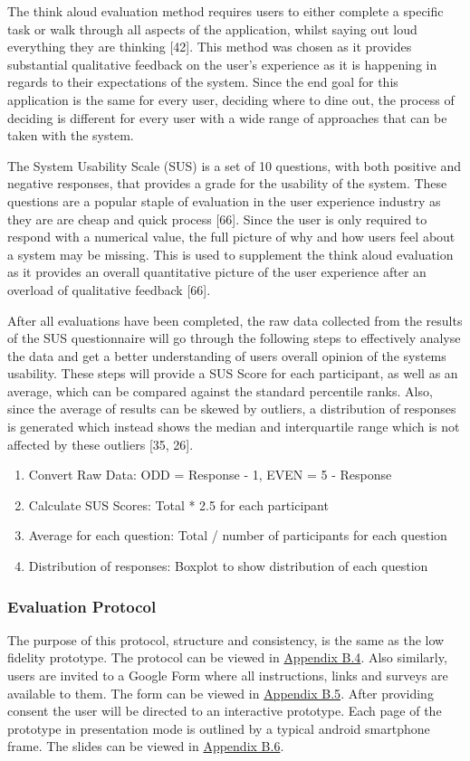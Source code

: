 \documentclass[a4 paper, 12pt]{article}
\begin{document}
    The think aloud evaluation method requires users to either complete a specific task or walk through all aspects of the application, whilst saying out loud everything they are thinking [42]. This method was chosen as it provides substantial qualitative feedback on the user's experience as it is happening in regards to their expectations of the system. Since the end goal for this application is the same for every user, deciding where to dine out, the process of deciding is different for every user with a wide range of approaches that can be taken with the system.

    The System Usability Scale (SUS) is a set of 10 questions, with both positive and negative responses, that provides a grade for the usability of the system. These questions are a popular staple of evaluation in the user experience industry as they are are cheap and quick process [66]. Since the user is only required to respond with a numerical value, the full picture of why and how users feel about a system may be missing. This is used to supplement the think aloud evaluation as it provides an overall quantitative picture of the user experience after an overload of qualitative feedback [66].
    
    After all evaluations have been completed, the raw data collected from the results of the SUS questionnaire will go through the following steps to effectively analyse the data and get a better understanding of users overall opinion of the systems usability. These steps will provide a SUS Score for each participant, as well as an average, which can be compared against the standard percentile ranks. Also, since the average of results can be skewed by outliers, a distribution of responses is generated which instead shows the median and interquartile range which is not affected by these outliers [35, 26].
        \begin{enumerate}
            \item Convert Raw Data: ODD = Response - 1, EVEN = 5 - Response
            \item Calculate SUS Scores: Total * 2.5 for each participant
            \item  Average for each question: Total / number of participants for each question
            \item Distribution of responses: Boxplot to show distribution of each question
        \end{enumerate}  

    \subsubsection{Evaluation Protocol}
    The purpose of this protocol, structure and consistency, is the same as the low fidelity prototype. The protocol can be viewed in \hyperref[sec:B.4]{Appendix B.4}. Also similarly, users are invited to a Google Form where all instructions, links and surveys are available to them. The form can be viewed in \hyperref[sec:B.5]{Appendix B.5}. After providing consent the user will be directed to an interactive prototype. Each page of the prototype in presentation mode is outlined by a typical android smartphone frame. The slides can be viewed in \hyperref[sec:B.1]{Appendix B.6}. 
\end{document}
